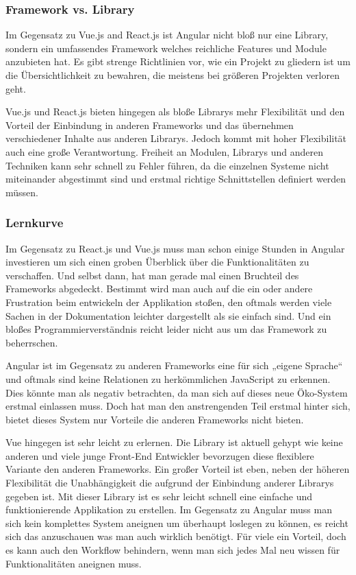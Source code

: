 \subsubsection{Framework vs. Library}
Im Gegensatz zu Vue.js and React.js ist Angular nicht bloß nur eine Library, sondern ein umfassendes Framework welches reichliche Features und Module anzubieten hat. Es gibt strenge Richtlinien vor, wie ein Projekt zu gliedern ist um die Übersichtlichkeit zu bewahren, die meistens bei größeren Projekten verloren geht.

Vue.js und React.js bieten hingegen als bloße Librarys mehr Flexibilität und den Vorteil der Einbindung in anderen Frameworks und das übernehmen verschiedener Inhalte aus anderen Librarys. Jedoch kommt mit hoher Flexibilität auch eine große Verantwortung. Freiheit an Modulen, Librarys und anderen Techniken kann sehr schnell zu Fehler führen, da die einzelnen Systeme nicht miteinander abgestimmt sind und erstmal richtige Schnittstellen definiert werden müssen.
\subsubsection{Lernkurve}
Im Gegensatz zu React.js und Vue.js muss man schon einige Stunden in Angular investieren um sich einen groben Überblick über die Funktionalitäten zu verschaffen. Und selbst dann, hat man gerade mal einen Bruchteil des Frameworks abgedeckt. Bestimmt wird man auch auf die ein oder andere Frustration beim entwickeln der Applikation stoßen, den oftmals werden viele Sachen in der Dokumentation leichter dargestellt als sie einfach sind. Und ein bloßes Programmierverständnis reicht leider nicht aus um das Framework zu beherrschen.

Angular ist im Gegensatz zu anderen Frameworks eine für sich „eigene Sprache“ und oftmals sind keine Relationen zu herkömmlichen JavaScript zu erkennen. Dies könnte man als negativ betrachten, da man sich auf dieses neue Öko-System erstmal einlassen muss. Doch hat man den anstrengenden Teil erstmal hinter sich, bietet dieses System nur Vorteile die anderen Frameworks nicht bieten.

Vue hingegen ist sehr leicht zu erlernen. Die Library ist aktuell gehypt wie keine anderen und viele junge Front-End Entwickler bevorzugen diese flexiblere Variante den anderen Frameworks. Ein großer Vorteil ist eben, neben der höheren Flexibilität die Unabhängigkeit die aufgrund der Einbindung anderer Librarys gegeben ist. Mit dieser Library ist es sehr leicht schnell eine einfache und funktionierende Applikation zu erstellen. Im Gegensatz zu Angular muss man sich kein komplettes System aneignen um überhaupt loslegen zu können, es reicht sich das anzuschauen was man auch wirklich benötigt. Für viele ein Vorteil, doch es kann auch den Workflow behindern, wenn man sich jedes Mal neu wissen für Funktionalitäten aneignen muss.

